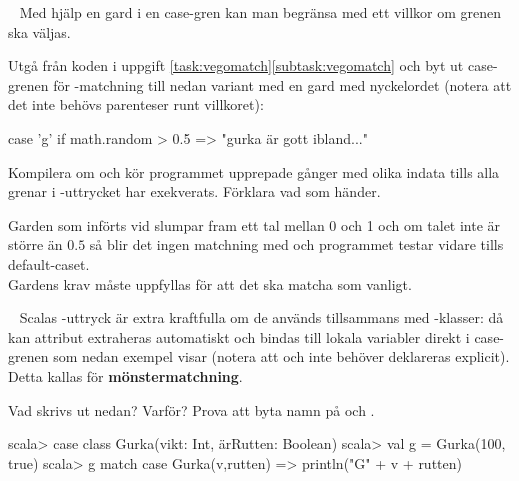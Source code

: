 \QUESTEND







\QUESTBEGIN

\Task  \what~  Med hjälp en gard  i en case-gren kan man begränsa med ett villkor om grenen ska väljas.

Utgå från koden i uppgift \ref{task:vegomatch}\ref{subtask:vegomatch} och byt ut case-grenen för -matchning till nedan variant med en gard med nyckelordet  (notera att det inte behövs parenteser runt villkoret):
\begin{Code}
    case 'g' if math.random > 0.5 => "gurka är gott ibland..."
\end{Code}
Kompilera om och kör programmet upprepade gånger med olika indata tills alla grenar i -uttrycket har exekverats. Förklara vad som händer.

\SOLUTION


\TaskSolved \what

Garden som införts vid  slumpar fram ett tal mellan 0 och 1 och om talet inte är större än $0.5$ så blir det ingen matchning med  och programmet testar vidare tills default-caset.\\
Gardens krav måste uppfyllas för att det ska matcha som vanligt.



\QUESTEND







\QUESTBEGIN

\Task \label{task:match-caseclass} \what~   Scalas -uttryck är extra kraftfulla om de används tillsammans med -klasser: då kan attribut extraheras automatiskt och bindas till lokala variabler direkt i case-grenen som nedan exempel visar (notera att  och  inte behöver deklareras explicit). Detta kallas för \textbf{mönstermatchning}.

\Subtask \label{subtask:autobinding-match} Vad skrivs ut nedan? Varför? Prova att byta namn på  och .
\begin{REPL}
scala> case class Gurka(vikt: Int, ärRutten: Boolean)
scala> val g = Gurka(100, true)
scala> g match { case Gurka(v,rutten) => println("G" + v + rutten) }
\end{REPL}

